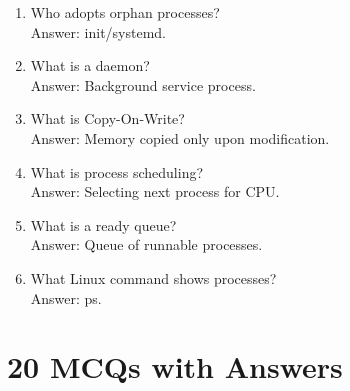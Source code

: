 \begin{enumerate}
\item Who adopts orphan processes?\\
Answer: init/systemd.

\item What is a daemon?\\
Answer: Background service process.

\item What is Copy-On-Write?\\
Answer: Memory copied only upon modification.

\item What is process scheduling?\\
Answer: Selecting next process for CPU.

\item What is a ready queue?\\
Answer: Queue of runnable processes.

\item What Linux command shows processes?\\
Answer: ps.
\end{enumerate}

\section{20 MCQs with Answers}

